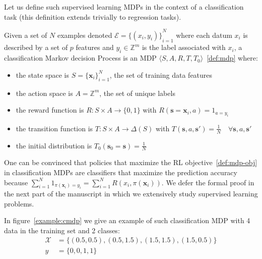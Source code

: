 Let us define such supervised learning MDPs in the context of a classification task (this definition extends trivially to regression tasks).
\begin{definition}\label{def:cmdp}
    Given a set of $N$ examples denoted $\mathcal{E} = {\{(x_i, y_i)\}}_{i=1}^N$ where each datum $x_i$ is described by a set of $p$ features and $y_i \in \mathbb{Z}^m$ is the label associated with $x_i$, a classification Markov decision Process is an MDP $\langle S, A, R, T, T_0 \rangle$~\ref{def:mdp} where:
    \begin{itemize}
        \item the state space is $S={\{\boldsymbol{x}_i\}}_{i=1}^N$, the set of training data features
        \item the action space is $A=\mathbb{Z}^m$, the set of unique labels
        \item the reward function is $R:S\times A \rightarrow \{0, 1\}$ with $R(\boldsymbol{s}=\boldsymbol{x}_i, a) = 1_{a=y_i}$
        \item the transition function is $T:S\times A \rightarrow \Delta(S)$ with $T(\boldsymbol{s}, a, \boldsymbol{s}') = \frac{1}{N} \quad \forall \boldsymbol{s}, a, \boldsymbol{s}'$
        \item the initial distribution is $T_0(\boldsymbol{s}_0 = \boldsymbol{s}) = \frac{1}{N}$
    \end{itemize}
\end{definition}

One can be convinced that policies that maximize the RL objective~\ref{def:mdp-obj} in classification MDPs are classifiers that maximize the prediction accuracy because $\sum_{i=1}^N 1_{\pi(\boldsymbol{x}_i)=y_i} = \sum_{i=1}^N R(x_i, \pi(\boldsymbol{x}_i))$.
We defer the formal proof in the next part of the manuscript in which we extensively study supervised learning problems.

In figure~\ref{example:cmdp} we give an example of such classification MDP with 4 data in the training set and 2 classes:
\begin{align*}
    \mathcal{X} &= \{(0.5, 0.5), (0.5, 1.5), (1.5, 1.5), (1.5, 0.5)\}\\
    y &= \{0, 0, 1, 1\} 
\end{align*}

